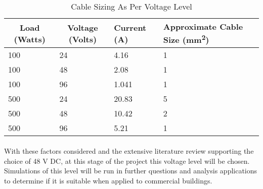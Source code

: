 \begin{table}[H]
\centering
\begin{tabular}{|l|l|l|p{5cm}|}
\hline
\multicolumn{1}{|c|}{\textbf{Load (Watts)}} & \multicolumn{1}{c|}{\textbf{Voltage (Volts)}} & \textbf{Current (A)} & \textbf{Approximate Cable Size (\si{mm^2})} \\ \hline
100 & 24 & 4.16 & 1 \\ \hline
100 & 48 & 2.08 & 1 \\ \hline
100 & 96 & 1.041 & 1 \\ \hline
500 & 24 & 20.83 & 5 \\ \hline
500 & 48 & 10.42 & 2 \\ \hline
500 & 96 & 5.21 & 1 \\ \hline
\end{tabular}
\caption{Cable Sizing As Per Voltage Level}
\label{table:lvdc-cables}
\end{table} 

\paragraph{}
With these factors considered and the extensive literature review supporting the choice of 48 V DC, at this stage of the project this voltage level will be chosen. Simulations of this level will be run in further questions and analysis applications to determine if it is suitable when applied to commercial buildings.  

   


